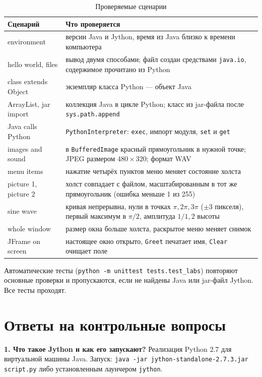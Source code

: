 \documentclass[14pt,a4paper]{extarticle}
\begin{document}
\begin{table}[H]
\caption{Проверяемые сценарии}
\label{tab:results}
\centering
\small
\begin{tabularx}{\textwidth}{lL}
\toprule
Сценарий & Что проверяется \\
\midrule
environment & версии Java и Jython, время из Java близко к времени компьютера \\
hello world, files & вывод двумя способами; файл создан средствами \texttt{java.io},
содержимое прочитано из Python \\
class extends Object & экземпляр класса Python --- объект Java \\
ArrayList, jar import & коллекция Java в цикле Python; класс из jar-файла после
\texttt{sys.path.append} \\
Java calls Python & \texttt{PythonInterpreter}: \texttt{exec}, импорт модуля, \texttt{set} и
\texttt{get} \\
images and sound & в \texttt{BufferedImage} красный прямоугольник в нужной точке; JPEG
размером $480\times320$; формат WAV \\
menu items & нажатие четырёх пунктов меню меняет состояние холста \\
picture 1, picture 2 & холст совпадает с файлом, масштабированным в тот же прямоугольник
(ошибка меньше 1 из 255) \\
sine wave & кривая непрерывна, нули в точках $\pi,2\pi,3\pi$ ($\pm3$ пикселя), первый
максимум в $\pi/2$, амплитуда $1/1{,}2$ высоты \\
whole window & размер окна больше холста, раскрытое меню меняет снимок \\
JFrame on screen & настоящее окно открыто, \texttt{Greet} печатает имя, \texttt{Clear}
очищает поле \\
\bottomrule
\end{tabularx}
\end{table}

Автоматические тесты (\texttt{python -m unittest tests.test\_labs}) повторяют основные
проверки и пропускаются, если не найдены Java или jar-файл Jython. Все тесты проходят.

\section{Ответы на контрольные вопросы}

\textbf{1. Что такое Jython и как его запускают?} Реализация Python 2.7 для
виртуальной машины Java. Запуск: \texttt{java -jar jython-standalone-2.7.3.jar
script.py} либо установленным лаунчером \texttt{jython}.
\end{document}
